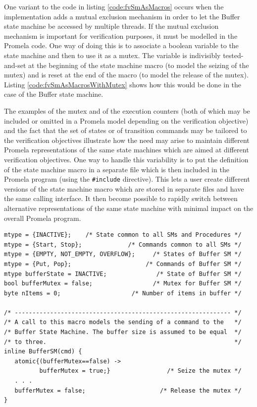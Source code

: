 \documentclass[definition]{../fwprofile}
\begin{document}
One variant to the code in listing \ref{code:fvSmAsMacros} occurs when the implementation adds a mutual exclusion mechanism in order to let the Buffer state machine be accessed by multiple threads. If the mutual exclusion mechanism is important for verification purposes, it must be modelled in the Promela code. One way of doing this is to associate a boolean variable to the state machine and then to use it as a mutex. The variable is indivisibly tested-and-set at the beginning of the state machine macro (to model the seizing of the mutex) and is reset at the end of the macro (to model the release of the mutex). Listing \ref{code:fvSmAsMacrosWithMutex} shows how this would be done in the case of the Buffer state machine.

The examples of the mutex and of the execution counters (both of which may be included or omitted in a Promela model depending on the verification objective) and the fact that the set of states or of transition commands may be tailored to the verification objectives illustrate how the need may arise to maintain different Promela representations of the same state machines which are aimed at different verification objectives. One way to handle this variability is to put the definition of the state machine macro in a separate file which is then included in the Promela program (using the \texttt{\#include} directive). This lets a user create different versions of the state machine macro which are stored in separate files and have the same calling interface. It then become possible to rapidly switch between alternative representations of the same state machine with minimal impact on the overall Promela program.

\begin{lstlisting}
mtype = {INACTIVE};    /* State common to all SMs and Procedures */
mtype = {Start, Stop};             /* Commands common to all SMs */
mtype = {EMPTY, NOT_EMPTY, OVERFLOW};     /* States of Buffer SM */
mtype = {Put, Pop};                     /* Commands of Buffer SM */
mtype bufferState = INACTIVE;              /* State of Buffer SM */
bool bufferMutex = false;                 /* Mutex for Buffer SM */
byte nItems = 0;                    /* Number of items in buffer */   

/* ------------------------------------------------------------- */
/* A call to this macro models the sending of a command to the   */ 
/* Buffer State Machine. The buffer size is assumed to be equal  */ 
/* to three.                                                     */
inline BufferSM(cmd) {
   atomic{(bufferMutex==false) ->
          bufferMutex = true;}                /* Seize the mutex */
   . . . 
   bufferMutex = false;                     /* Release the mutex */
} 
\end{lstlisting}
\end{document}
